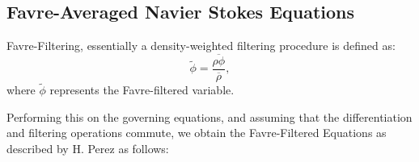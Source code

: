 \subsection{Favre-Averaged Navier Stokes Equations} \label{section:Favre}
Favre-Filtering, essentially a density-weighted filtering procedure is defined as:
\begin{equation}
 \tilde{\phi}=\frac{\overline{\rho \phi}}{\overline{\rho}},
 \end{equation}
where $\tilde{\phi}$ represents the Favre-filtered variable.

Performing this on the governing equations, and assuming that the differentiation and filtering operations commute, we obtain the Favre-Filtered Equations as described by H. Perez \cite{HPerez:2011} as follows:\par


